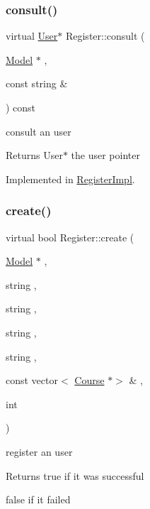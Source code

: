 \subsubsection{\texorpdfstring{consult()}{consult()}}
{\footnotesize\ttfamily virtual \hyperlink{classUser}{User}$\ast$ Register\+::consult (\begin{DoxyParamCaption}\item[{\hyperlink{classModel}{Model} $\ast$}]{,  }\item[{const string \&}]{ }\end{DoxyParamCaption}) const\hspace{0.3cm}{\ttfamily [pure virtual]}}



consult an user 

\begin{DoxyReturn}{Returns}
User$\ast$ the user pointer 
\end{DoxyReturn}


Implemented in \hyperlink{classRegisterImpl_afe762d2896bb50b551e7b317c4936ac3}{Register\+Impl}.

\mbox{\label{classRegister_acfb8b5ecf7181faff5584765d78ab671}} 
\subsubsection{\texorpdfstring{create()}{create()}}
{\footnotesize\ttfamily virtual bool Register\+::create (\begin{DoxyParamCaption}\item[{\hyperlink{classModel}{Model} $\ast$}]{,  }\item[{string}]{,  }\item[{string}]{,  }\item[{string}]{,  }\item[{string}]{,  }\item[{const vector$<$ \hyperlink{classCourse}{Course} $\ast$$>$ \&}]{,  }\item[{int}]{ }\end{DoxyParamCaption})\hspace{0.3cm}{\ttfamily [pure virtual]}}



register an user 

\begin{DoxyReturn}{Returns}
true if it was successful 

false if it failed 
\end{DoxyReturn}


